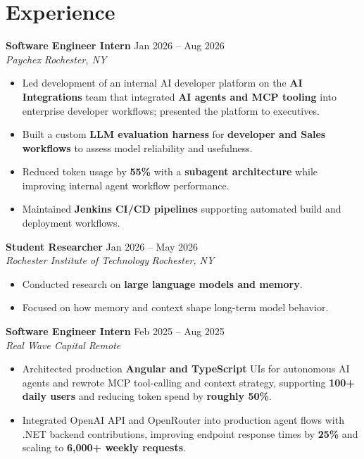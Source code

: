 \documentclass[10pt,letterpaper]{article}
\newif\ifresumeFirstRole
\newcommand{\resumeRole}[4]{%
  \ifresumeFirstRole
    \global\resumeFirstRolefalse
  \else
    \vspace{0pt plus 1fill}%
  \fi
  \textbf{#1} \hfill #2\\
  \textit{#3} \hfill \textit{#4}
}
\begin{document}
\section*{Experience}
\resumeRole{Software Engineer Intern}{Jan 2026 -- Aug 2026}{Paychex}{Rochester, NY}
\begin{itemize}
  \item Led development of an internal AI developer platform on the \textbf{AI Integrations} team that integrated \textbf{AI agents and MCP tooling} into enterprise developer workflows; presented the platform to executives.
  \item Built a custom \textbf{LLM evaluation harness} for \textbf{developer and Sales workflows} to assess model reliability and usefulness.
  \item Reduced token usage by \textbf{55\%} with a \textbf{subagent architecture} while improving internal agent workflow performance.
  \item Maintained \textbf{Jenkins CI/CD pipelines} supporting automated build and deployment workflows.
\end{itemize}

\resumeRole{Student Researcher}{Jan 2026 -- May 2026}{Rochester Institute of Technology}{Rochester, NY}
\begin{itemize}
  \item Conducted research on \textbf{large language models and memory}.
  \item Focused on how memory and context shape long-term model behavior.
\end{itemize}

\resumeRole{Software Engineer Intern}{Feb 2025 -- Aug 2025}{Real Wave Capital}{Remote}
\begin{itemize}
  \item Architected production \textbf{Angular and TypeScript} UIs for autonomous AI agents and rewrote MCP tool-calling and context strategy, supporting \textbf{100+ daily users} and reducing token spend by \textbf{roughly 50\%}.
  \item Integrated OpenAI API and OpenRouter into production agent flows with .NET backend contributions, improving endpoint response times by \textbf{25\%} and scaling to \textbf{6,000+ weekly requests}.
\end{itemize}
\end{document}
